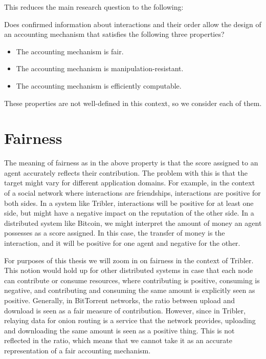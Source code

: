 \documentclass[a4paper,11pt]{book}
\theoremstyle{definition}
\begin{document}
This reduces the main research question
to the following:

\begin{center}
    Does confirmed information about interactions and their order allow the design of an accounting mechanism
    that satisfies the following three properties?
\end{center}

\begin{itemize}
    \item The accounting mechanism is fair. 
    \item The accounting mechanism is manipulation-resistant.
    \item The accounting mechanism is efficiently computable.
\end{itemize}

These properties are not well-defined in this context, so we consider each of them.

\section{Fairness}

The meaning of fairness as in the above property is that the score assigned to an agent
accurately reflects their contribution. The problem with this is that the target might
vary for different application domains. For example, in the context of a social
network where interactions are friendships, interactions are positive for both sides.
In a system like Tribler, interactions will be positive for at least one side, but
might have a negative impact on the reputation of the other side. In a distributed system like Bitcoin,
we might interpret the amount of money an agent possesses as a score assigned. In
this case, the transfer of money is the interaction, and it will be positive for one
agent and negative for the other.

For purposes of this thesis we will zoom in on fairness in the context of Tribler.
This notion would hold up for other distributed systems in case that each node
can contribute or consume resources, where contributing is positive, consuming
is negative, and contributing and consuming the same amount is explicitly seen as positive.
Generally, in BitTorrent networks, the ratio between upload and download is seen
as a fair measure of contribution. However, since in Tribler, relaying data for onion
routing is a service that the network provides, uploading and downloading the same
amount is seen as a positive thing. This is not reflected in the ratio, which
means that we cannot take it as an accurate representation of a fair accounting mechanism.
\end{document}
